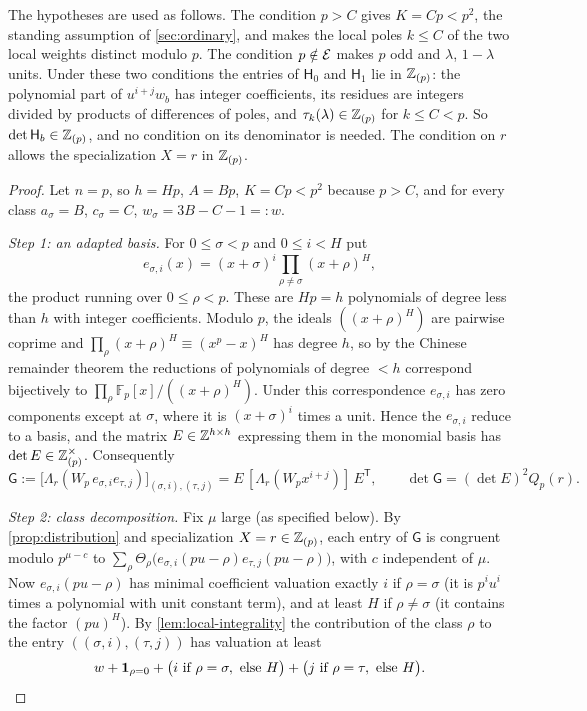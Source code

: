 The hypotheses are used as follows. The condition $p>C$ gives $K=Cp<p^2$, the standing assumption of \cref{sec:ordinary}, and makes the local poles $k\le C$ of the two local weights distinct modulo $p$. The condition $p\notin\mathcal{E}$ makes $p$ odd and $\lambda$, $1-\lambda$ units. Under these two conditions the entries of $\mathsf H_0$ and $\mathsf H_1$ lie in $\mathbb{Z}_{(p)}$: the polynomial part of $u^{i+j}w_b$ has integer coefficients, its residues are integers divided by products of differences of poles, and $\tau_k(\lambda)\in\mathbb{Z}_{(p)}$ for $k\le C<p$. So $\det\mathsf H_b\in\mathbb{Z}_{(p)}$, and no condition on its denominator is needed. The condition on $r$ allows the specialization $X=r$ in $\mathbb{Z}_{(p)}$.

\begin{proof}
Let $n=p$, so $h=Hp$, $A=Bp$, $K=Cp<p^2$ because $p>C$, and for every class $a_\sigma=B$, $c_\sigma=C$, $w_\sigma=3B-C-1=:w$.

\emph{Step 1: an adapted basis.} For $0\le\sigma<p$ and $0\le i<H$ put
\[
e_{\sigma,i}(x)=(x+\sigma)^i\prod_{\rho\ne\sigma}(x+\rho)^H,
\]
the product running over $0\le\rho<p$. These are $Hp=h$ polynomials of degree less than $h$ with integer coefficients. Modulo $p$, the ideals $((x+\rho)^H)$ are pairwise coprime and $\prod_\rho(x+\rho)^H\equiv(x^p-x)^H$ has degree $h$, so by the Chinese remainder theorem the reductions of polynomials of degree $<h$ correspond bijectively to $\prod_\rho\mathbb F_p[x]/((x+\rho)^H)$. Under this correspondence $e_{\sigma,i}$ has zero components except at $\sigma$, where it is $(x+\sigma)^i$ times a unit. Hence the $e_{\sigma,i}$ reduce to a basis, and the matrix $E\in\mathbb{Z}^{h\times h}$ expressing them in the monomial basis has $\det E\in\mathbb{Z}_{(p)}^\times$. Consequently
\[
\mathsf G:=\bigl[\Lambda_r(W_p\,e_{\sigma,i}e_{\tau,j})\bigr]_{(\sigma,i),(\tau,j)}=E\,[\Lambda_r(W_px^{i+j})]\,E^{\mathsf T},\qquad \det\mathsf G=(\det E)^2Q_p(r).
\]

\emph{Step 2: class decomposition.} Fix $\mu$ large (as specified below). By \cref{prop:distribution} and specialization $X=r\in\mathbb{Z}_{(p)}$, each entry of $\mathsf G$ is congruent modulo $p^{\mu-c}$ to $\sum_{\rho}\Theta_\rho\bigl(e_{\sigma,i}(pu-\rho)e_{\tau,j}(pu-\rho)\bigr)$, with $c$ independent of $\mu$. Now $e_{\sigma,i}(pu-\rho)$ has minimal coefficient valuation exactly $i$ if $\rho=\sigma$ (it is $p^iu^i$ times a polynomial with unit constant term), and at least $H$ if $\rho\ne\sigma$ (it contains the factor $(pu)^H$). By \cref{lem:local-integrality} the contribution of the class $\rho$ to the entry $((\sigma,i),(\tau,j))$ has valuation at least
\[
w+\ind_{\rho=0}+\bigl(i\ \text{if}\ \rho=\sigma,\ \text{else}\ H\bigr)+\bigl(j\ \text{if}\ \rho=\tau,\ \text{else}\ H\bigr).
\]


\end{proof}
